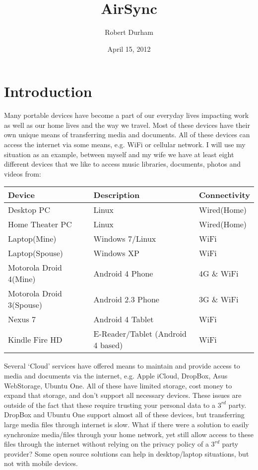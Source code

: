 \documentclass[12pt,draft]{article}
\begin{document}
\title {AirSync}
\author {Robert Durham}
\date {April 15, 2012}
\maketitle

\section{Introduction}
Many portable devices have become a part of our everyday lives impacting work as well as our home lives and the way we travel. Most of these devices have their own unique means of transferring media and documents. All of these devices can access the internet via some means, e.g. WiFi or cellular network. I will use my situation as an example, between myself and my wife we have at least eight different devices that we like to access music libraries, documents, photos and videos from:

\footnotesize
\begin{center}
\begin{tabular}{|l|l|l|}
\hline
	\textbf{Device} & \textbf{Description} & \textbf{Connectivity}\\
\hline
	Desktop PC & Linux & Wired(Home)\\
\hline 
	Home Theater PC & Linux & Wired(Home)\\
\hline
	Laptop(Mine) & Windows 7/Linux & WiFi\\
\hline
	Laptop(Spouse) & Windows XP & WiFi\\
\hline
	Motorola Droid 4(Mine) & Android 4 Phone & 4G \& WiFi\\
\hline
	Motorola Droid 3(Spouse) & Android 2.3 Phone & 3G \& WiFi\\
\hline
	Nexus 7 & Android 4 Tablet & WiFi\\
\hline
	Kindle Fire HD & E-Reader/Tablet (Android 4 based) & WiFi\\
\hline
\end{tabular}
\end{center}
\normalsize
Several `Cloud' services have offered means to maintain and provide access to media and documents via the internet, e.g. Apple iCloud, DropBox, Asus WebStorage, Ubuntu One. All of these have limited storage, cost money to expand that storage, and don't support all necessary devices. These issues are outside of the fact that these require trusting your personal data to a $3^{rd}$ party. DropBox and Ubuntu One support almost all of these devices, but transferring large media files through internet is slow. What if there were a solution to easily synchronize media/files through your home network, yet still allow access to these files through the internet without relying on the privacy policy of a $3^{rd}$ party provider? Some open source solutions can help in desktop/laptop situations, but not with mobile devices.
\end{document}
